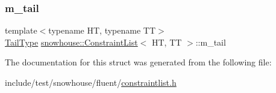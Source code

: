\subsubsection{\texorpdfstring{m\_tail}{m\_tail}}
{\footnotesize\ttfamily template$<$typename HT, typename TT$>$ \\
\mbox{\hyperlink{structsnowhouse_1_1ConstraintList_adf892be082855aa10589d067cee68780}{Tail\+Type}} \mbox{\hyperlink{structsnowhouse_1_1ConstraintList}{snowhouse\+::\+Constraint\+List}}$<$ HT, TT $>$\+::m\+\_\+tail}



The documentation for this struct was generated from the following file\+:\begin{DoxyCompactItemize}
\item 
include/test/snowhouse/fluent/\mbox{\hyperlink{constraintlist_8h}{constraintlist.\+h}}\end{DoxyCompactItemize}
